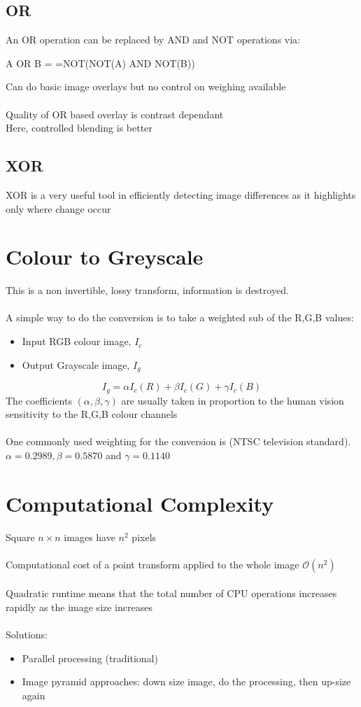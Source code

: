 \documentclass{article}[18pt]
\begin{document}
\subsection{OR}
An OR operation can be replaced by AND and NOT operations via:
\begin{center}
	A OR B = =NOT(NOT(A) AND NOT(B))
\end{center}
Can do basic image overlays but no control on weighing available\\
\\
Quality of OR based overlay is contrast dependant\\
Here, controlled blending is better
\subsection{XOR}
XOR is a very useful tool in efficiently detecting image differences as it highlights only where change occur
\section{Colour to Greyscale}
This is a non invertible, lossy transform, information is destroyed. \\
\\
A simple way to do the conversion is to take a weighted sub of the R,G,B values:
\begin{itemize}
	\item Input RGB colour image, $I_c$
	\item Output Grayscale image, $I_g$
\end{itemize}
$$I_g=\alpha I_c (R) + \beta I_c (G) + \gamma I_c(B)$$
The coefficients $(\alpha, \beta, \gamma)$ are usually taken in proportion to the human vision sensitivity to the R,G,B colour channels\\
\\
One commonly used weighting for the conversion is (NTSC television standard). $\alpha=0.2989, \beta = 0.5870$ and $\gamma=0.1140$
\section{Computational Complexity}
Square $n\times n$ images have $n^2$ pixels\\
\\
Computational cost of a point transform applied to the whole image $\mathcal{O}(n^2)$\\
\\
Quadratic runtime means that the total number of CPU operations increases rapidly as the image size increases\\
\\
Solutions:
\begin{itemize}
	\item Parallel processing (traditional)
	\item Image pyramid approaches: down size image, do the processing, then up-size again
\end{itemize}
\end{document}
